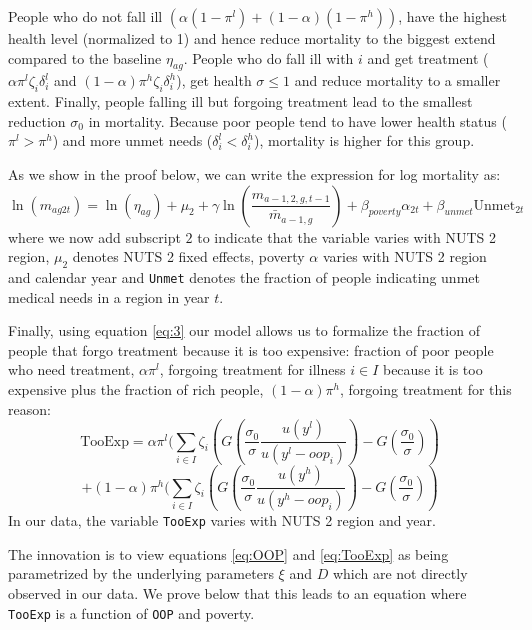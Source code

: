 \documentclass[a4paper,12pt]{article}
\begin{document}
People who do not fall ill \((\alpha(1-\pi^l)+(1-\alpha)(1-\pi^h))\), have the highest health level (normalized to 1) and hence reduce mortality to the biggest extend compared to the baseline \(\eta_{ag}\). People who do fall ill with \(i\) and get treatment (\(\alpha \pi^l \zeta_i \delta_i^l\) and \((1-\alpha)\pi^h \zeta_i \delta_i^h\)), get health \(\sigma \leq 1\) and reduce mortality to a smaller extent. Finally, people falling ill but forgoing treatment lead to the smallest reduction \(\sigma_0\) in mortality. Because poor people tend to have lower health status (\(\pi^l>\pi^h\)) and more unmet needs (\(\delta_i^l<\delta_i^h\)), mortality is higher for this group. 

As we show in the proof below, we can write the expression for log mortality as:
\begin{equation}
\label{eq:health2}
\ln(m_{ag2t}) =\ln ( \eta_{ag}) + \mu_2 + \gamma \ln \left( \frac{m_{a-1,2,g,t-1}}{\bar m_{a-1,g}}\right) + \beta_{poverty}\alpha_{2t} + \beta_{unmet}\text{Unmet}_{2t}
\end{equation}
where we now add subscript \(2\) to indicate that the variable varies with NUTS 2 region, \(\mu_2\) denotes NUTS 2 fixed effects, poverty \(\alpha\) varies with NUTS 2 region and calendar year and \texttt{Unmet} denotes the fraction of people indicating unmet medical needs in a region in year \(t\).

Finally, using equation \eqref{eq:3} our model allows us to formalize the fraction of people that forgo treatment because it is too expensive: fraction of poor people who need treatment, \(\alpha \pi^l\), forgoing treatment for illness \(i \in I\) because it is too expensive plus the fraction of rich people, \((1-\alpha)\pi^h\), forgoing treatment for this reason:
\begin{equation}
\label{eq:TooExp}
\text{TooExp} = \alpha \pi^l (\sum_{i \in I}\zeta_{i} \left(G\left( \frac{\sigma_0}{\sigma} \frac{u(y^{l})}{u(y^{l}-oop_{i})} \right) - G\left( \frac{\sigma_0}{\sigma} \right) \right )
\end{equation}
\begin{equation*}
 + (1-\alpha) \pi^h (\sum_{i \in I}\zeta_{i} \left(G\left( \frac{\sigma_0}{\sigma} \frac{u(y^{h})}{u(y^{h}-oop_{i})} \right) - G\left( \frac{\sigma_0}{\sigma} \right) \right )
\end{equation*}
In our data, the variable \texttt{TooExp} varies with NUTS 2 region and year.

The innovation is to view equations \eqref{eq:OOP} and \eqref{eq:TooExp} as being parametrized by the underlying parameters \(\xi\) and \(D\) which are not directly observed in our data. We prove below that this leads to an equation where \texttt{TooExp} is a function of \texttt{OOP} and poverty.
\end{document}
